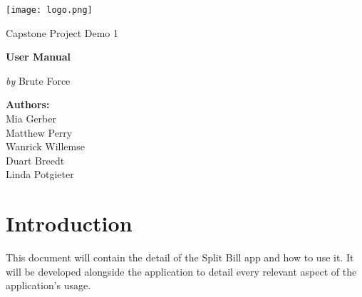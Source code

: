 \documentclass[12pt,a4paper]{article}
\begin{document}
    \begin{titlepage}
        {\selectfont
            \centering
            \texttt{[image: logo.png]}\par\vspace{1cm}
            {\LARGE Capstone Project Demo 1 \par}
            \vspace{0.25cm}
            {\huge\bfseries \color{cyan}User Manual\par}
            \vspace{1cm}
            {\Large\textit{by} Brute Force\par}
            \vspace{0.25cm}

            \par\vspace{1cm}
            \date{}
            \author{}
            \title{}
            \centering
            \textbf{Authors:}\\
            Mia Gerber\\
            Matthew Perry\\
            Wanrick Willemse\\
            Duart Breedt\\
            Linda Potgieter\\
        }
    \end{titlepage}
    \maketitle
    \tableofcontents
    \newpage

    \section{Introduction}
    This document will contain the detail of the Split Bill app and how to use it. It will be developed alongside the application to detail every relevant aspect of the application's usage.    
\end{document}
